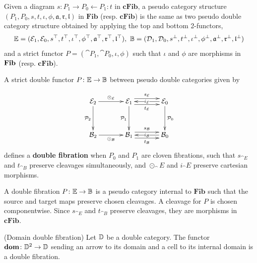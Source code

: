 \documentclass[9pt, leqno]{amsart}
\begin{document}
\begin{lemma}
	Given a diagram $s \colon P_1 \to P_0 \leftarrow P_1 \colon t$ in $\mathbf{cFib}$, a pseudo category structure $(P_1, P_0, s, t, \iota, \phi, \mathfrak{a}, \mathfrak{r}, \mathfrak{l})$ in $\mathbf{Fib}$ (resp. $\mathbf{cFib}$) is the same as two pseudo double category structure obtained by applying the top and bottom 2-functors,
	\begin{equation*}
		\mathbb{E} = (\mathcal{E}_1, \mathcal{E}_0, s^\top, t^\top, \iota^\top, \phi^\top, \mathfrak{a}^\top, \mathfrak{r}^\top, \mathfrak{l}^\top),\ \mathbb{B} = (\mathcal{D}_1, \mathcal{D}_0, s^\bot, t^\bot, \iota^\bot, \phi^\bot, \mathfrak{a}^\bot, \mathfrak{r}^\bot, \mathfrak{l}^\bot)
	\end{equation*}
	and a strict functor $P = (\cat{P}_1, \cat{P}_0, \iota, \phi)$ such that $\iota$ and $\phi$ are morphisms in $\operatorname{\mathbf{Fib}}$ (resp. $\mathbf{cFib}$).
\end{lemma}

\begin{defn}\cite[$\S 2$ ibid]{Crutt}
	A strict double functor $P \colon \mathbb{E} \to \mathbb{B}$ between pseudo double categories given by 
	
	\begin{equation*}
		\xymatrix@=0.5cm{
			\cat{E}_2 \ar[rr]^{\odot_\cat{E}} \ar[dd]_{\cat{P}_2} && \cat{E}_1 \ar[dd]_{\cat{P}_1} \ar@<1ex>[rr]^{s_\cat{E}} \ar@<-1ex>[rr]_{t_\cat{E}} && \cat{E}_0 \ar[dd]^{\cat{P}_0} \ar[ll]|-{i_\cat{E}} \\
			\\
			\cat{B}_2 \ar[rr]_{\odot_\cat{B}} && \cat{B}_1 \ar@<1ex>[rr]^{s_\cat{B}} \ar@<-1ex>[rr]_{t_\cat{B}} && \cat{B}_0 \ar[ll]|-{i_\cat{B}}
		}
	\end{equation*}
	defines a \textbf{double fibration} when $P_0$ and $P_1$ are cloven fibrations, such that $s_{\cat{E}}$ and $t_{\cat{B}}$ preserve cleavages simultaneously, and $\odot_\cat{E}$ and $i_\cat{E}$ preserve cartesian morphisms.
\end{defn}

\begin{remark}
	A  double fibration $P \colon \mathbb{E} \to \mathbb{B}$ is a pseudo category internal to $\mathbf{Fib}$ such that the source and target maps preserve chosen cleavages. A cleavage for $P$ is chosen componentwise. Since $s_{\cat{E}}$ and $t_{\cat{B}}$ preserve cleavages, they are morphisms in $\mathbf{cFib}$.
\end{remark}

\begin{example}(Domain double fibration)
	Let $\mathbb{D}$ be a double category. The functor $\textbf{dom} \colon \mathbb{D}^2 \to \mathbb{D}$ sending an arrow to its domain and a cell to its internal domain is a double fibration. 
\end{example}
\end{document}
